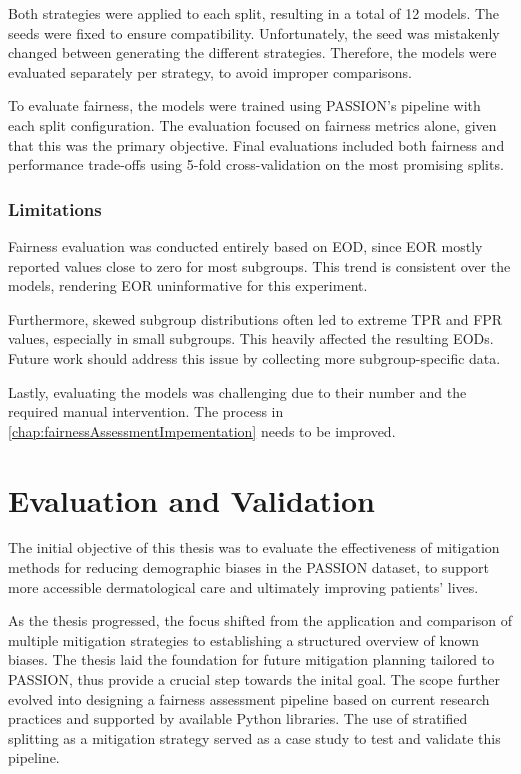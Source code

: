 \documentclass[12pt, a4paper, oneside]{book}   	%
\begin{document}
		Both strategies were applied to each split, resulting in a total of 12 models. The seeds were fixed to ensure compatibility. Unfortunately, the seed was mistakenly changed between generating the different strategies. Therefore, the models were evaluated separately per strategy, to avoid improper comparisons.
		
		To evaluate fairness, the models were trained using PASSION's pipeline with each split configuration. The evaluation focused on fairness metrics alone, given that this was the primary objective. Final evaluations included both fairness and performance trade-offs using 5-fold cross-validation on the most promising splits.
		
		\subsection{Limitations} \label{chap:limitationslowSupport}
		Fairness evaluation was conducted entirely based on \gls{EOD}, since \gls{EOR} mostly reported values close to zero for most subgroups. This trend is consistent over the models, rendering \gls{EOR} uninformative for this experiment. 
		
		Furthermore, skewed subgroup distributions often led to extreme \gls{TPR} and \gls{FPR} values, especially in small subgroups. This heavily affected the resulting \glspl{EOD}. Future work should address this issue by collecting more subgroup-specific data.
		
		Lastly, evaluating the models was challenging due to their number and the required manual intervention. The process in \autoref{chap:fairnessAssessmentImpementation} needs to be improved.
		
		
	\chapter{Evaluation and Validation}
		The initial objective of this thesis was to evaluate the effectiveness of mitigation methods for reducing demographic biases in the PASSION dataset, to support more accessible dermatological care and ultimately improving patients’ lives.
			
		As the thesis progressed, the focus shifted from the application and comparison of multiple mitigation strategies to establishing a structured overview of known biases. The thesis laid the foundation for future mitigation planning tailored to PASSION, thus provide a crucial step towards the inital goal. The scope further evolved into designing a fairness assessment pipeline based on current research practices and supported by available Python libraries. The use of stratified splitting as a mitigation strategy served as a case study to test and validate this pipeline.
		
\end{document}
